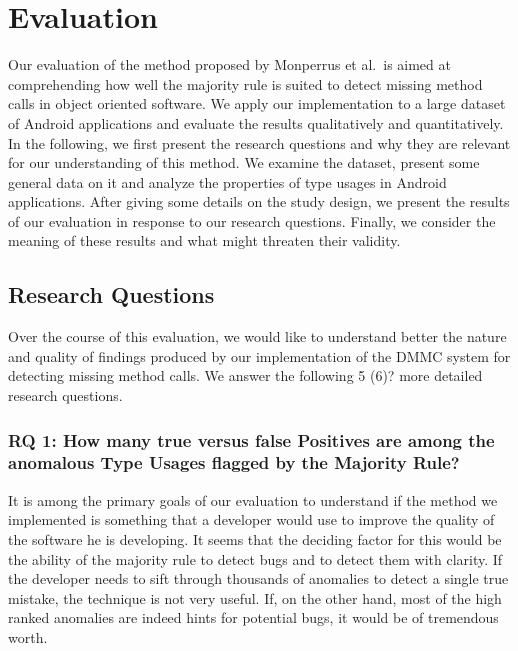 \chapter{Evaluation}\label{ch:eval}

Our evaluation of the method proposed by Monperrus et al.\ is aimed at comprehending how well the majority rule is suited to detect missing method calls in object oriented software.
We apply our implementation to a large dataset of Android applications and evaluate the results qualitatively and quantitatively.
In the following, we first present the research questions and why they are relevant for our understanding of this method.
We examine the dataset, present some general data on it and analyze the properties of type usages in Android applications.
After giving some details on the study design, we present the results of our evaluation in response to our research questions.
Finally, we consider the meaning of these results and what might threaten their validity.

\section{Research Questions}

Over the course of this evaluation, we would like to understand better the nature and quality of findings produced by our implementation of the $\text{DMMC}$ system for detecting missing method calls.
We answer the following 5 (6)? more detailed research questions.

\subsection{RQ 1: How many true versus false Positives are among the anomalous Type Usages flagged by the Majority Rule?}

It is among the primary goals of our evaluation to understand if the method we implemented is something that a developer would use to improve the quality of the software he is developing.
It seems that the deciding factor for this would be the ability of the majority rule to detect bugs and to detect them with clarity.
If the developer needs to sift through thousands of anomalies to detect a single true mistake, the technique is not very useful.
If, on the other hand, most of the high ranked anomalies are indeed hints for potential bugs, it would be of tremendous worth.

